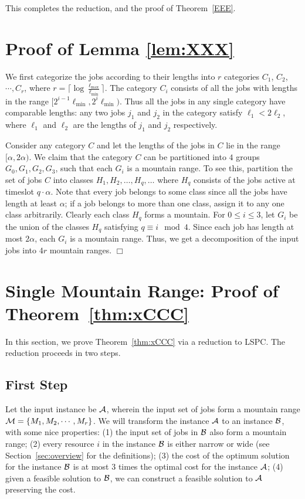 \documentclass[11pt]{article}
\newcommand{\qed} {\hfill$\Box$}
\newcommand{\lspc}{{\sc LSPC}}
\newcommand{\cM}{{\cal M}}
\newcommand{\cA} {{\cal A}}
\newcommand{\cB} {{\cal B}}
\begin{document}
This completes the reduction, and the proof of Theorem~\ref{EEE}.




\appendix
\section{Proof of Lemma \ref{lem:XXX}}
\label{sec:DDD}
We first categorize the jobs according to their  lengths into $r$ categories $C_1$, $C_2$, $\cdots, C_r$, where 
$r = \lceil \log \frac{\ell_{\max}}{\ell_{\min}}\rceil$.
The category $C_i$ consists of all the jobs with lengths in the range $[2^{i-1}{\ell_{\min}}, 2^i{\ell_{\min}})$.
Thus all the jobs in any single category have comparable lengths: 
any two jobs $j_1$ and $j_2$ in the category satisfy $\ell_{1} < 2\ell_{2}$, where 
$\ell_1$ and $\ell_2$ are the lengths of $j_1$ and $j_2$ respectively.

Consider any category $C$ and let the lengths of the jobs in $C$ lie in the range $[\alpha, 2\alpha)$.
We claim that the category $C$ can be partitioned into $4$ groups $G_0, G_1, G_2, G_3$, such that 
each $G_i$ is a mountain range. 
To see this, 
partition the set of jobs $C$ into classes $H_1, H_2, \ldots, H_q, \ldots$ where $H_q$ consists of the jobs
active at timeslot $q \cdot \alpha$.
Note that every job belongs to some class since all the jobs have
length at least $\alpha$; if a job belongs to more than one class, assign it to any one class arbitrarily.
Clearly each class $H_q$ forms a mountain. 
For $0 \le i \le 3$, let $G_i$ be the union of the classes $H_q$ satisfying $q \equiv i \mod 4$.
Since each job has length at most $2\alpha$, each $G_i$ is a mountain range.
Thus, we get a decomposition of the input jobs into $4r$ mountain ranges.
\qed

\section{Single Mountain Range: Proof of Theorem~\ref{thm:xCCC}}
\label{app:red}
In this section, we prove Theorem~\ref{thm:xCCC} via a reduction to {\lspc}. 
The reduction proceeds in two steps. 

\subsection{First Step}
Let the input instance be $\cA$, wherein the input set of jobs form a mountain range $\cM = \{M_1, M_2, \cdots, M_r\}$. We will transform the instance $\cA$ to an instance $\cB$, with some nice properties:
(1) the input set of jobs in $\cB$ also form a mountain range;
(2) every resource $i$ in the instance $\cB$ is either narrow or wide (see Section~\ref{sec:overview} for the definitions);
(3) the cost of the optimum solution for the instance $\cB$ is at most $3$ times the optimal cost for
the instance $\cA$;
(4) given a feasible solution to $\cB$, we can construct a feasible solution to $\cA$ preserving the cost. 
\end{document}

